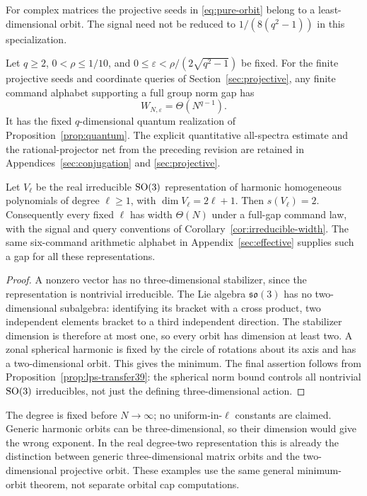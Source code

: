For complex matrices the projective seeds in
\eqref{eq:pure-orbit} belong to a least-dimensional orbit. The signal
need not be reduced to $1/(8(q^2-1))$ in this specialization.
\begin{corollary}\label{cor:projective39}
Let $q\ge2$, $0<\rho\le1/10$, and
$0\le\varepsilon<\rho/(2\sqrt{q^2-1})$ be fixed. For the finite
projective seeds and coordinate queries of Section~\ref{sec:projective},
any finite command alphabet supporting a full group norm gap has
\[
                       W_{N,\varepsilon}=\Theta(N^{q-1}).
\]
It has the fixed $q$-dimensional quantum realization of
Proposition~\ref{prop:quantum}. The explicit quantitative all-spectra
estimate and the rational-projector net from the preceding revision
are retained in Appendices~\ref{sec:conjugation} and \ref{sec:projective}.
\end{corollary}

\begin{proposition}\label{prop:harmonic-family}
Let $V_\ell$ be the real irreducible $\operatorname{SO}(3)$ representation of
harmonic homogeneous polynomials of degree $\ell\ge1$, with
$\dim V_\ell=2\ell+1$. Then $s(V_\ell)=2$. Consequently every fixed
$\ell$ has width $\Theta(N)$ under a full-gap command law, with the
signal and query conventions of Corollary~\ref{cor:irreducible-width}.
The same six-command arithmetic alphabet in Appendix~\ref{sec:effective}
supplies such a gap for all these representations.
\end{proposition}
\begin{proof}
A nonzero vector has no three-dimensional stabilizer, since the
representation is nontrivial irreducible. The Lie algebra
$\mathfrak{so}(3)$ has no two-dimensional subalgebra: identifying its
bracket with a cross product, two independent elements bracket to a
third independent direction. The stabilizer dimension is therefore
at most one, so every orbit has dimension at least two. A zonal
spherical harmonic is fixed by the circle of rotations about its
axis and has a two-dimensional orbit. This gives the minimum.
The final assertion follows from Proposition~\ref{prop:lps-transfer39}:
the spherical norm bound controls all nontrivial $\operatorname{SO}(3)$ irreducibles,
not just the defining three-dimensional action.
\end{proof}
The degree is fixed before $N\to\infty$; no uniform-in-$\ell$ constants
are claimed. Generic harmonic orbits can be three-dimensional, so their
dimension would give the wrong exponent. In the real degree-two
representation this is already the distinction between generic
three-dimensional matrix orbits and the two-dimensional projective
orbit. These examples use the same general minimum-orbit theorem,
not separate orbital cap computations.
